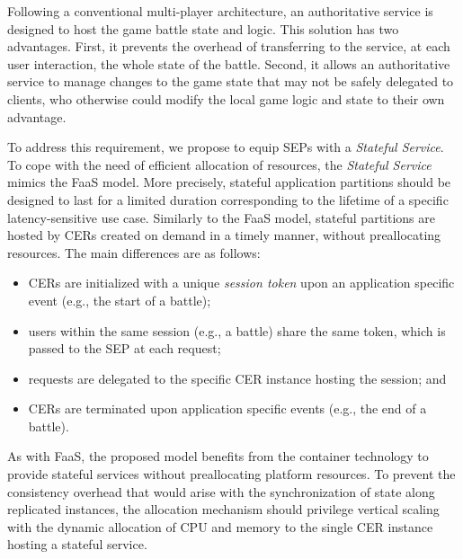 Following a conventional multi-player architecture, an authoritative service is designed to host the game battle state and logic. This solution has two advantages. First, it prevents the overhead of transferring to the service, at each user interaction, the whole state of the battle. Second, it allows an authoritative service to manage changes to the game state that may not be safely delegated to clients, who otherwise could modify the local game logic and state to their own advantage.


To address this requirement, we propose to equip SEPs with a \textit{Stateful Service}. 
To cope with the need of efficient allocation of resources, the \textit{Stateful Service} mimics the FaaS model. More precisely, stateful application partitions should be designed to last for a limited duration corresponding to the lifetime of a specific latency-sensitive use case. Similarly to the FaaS model, stateful partitions are hosted by CERs created on demand in a timely manner, without preallocating resources. The main differences are as follows:

\begin{itemize}
    
    \item CERs are initialized with a unique \textit{session token} upon an application specific event (e.g., the start of a battle);
    
    \item users within the same session (e.g., a battle) share the same token, which is passed to the SEP at each request; %
    
    \item requests are delegated to the specific CER instance hosting the session; and 
    
    \item CERs are terminated upon application specific events (e.g., the end of a battle).
    
\end{itemize}

As with FaaS, the proposed model benefits from the container technology to provide stateful services without preallocating platform resources. 
To prevent the consistency overhead that would arise with the synchronization of state along replicated instances, the allocation mechanism should privilege vertical scaling with the dynamic allocation of CPU and memory to the single CER instance hosting a stateful service. 

